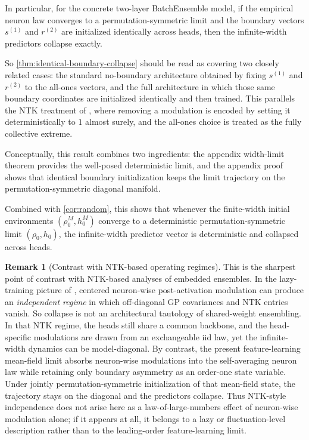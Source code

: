 \documentclass[11pt]{article}
\theoremstyle{definition}
\newtheorem{remark}[theorem]{Remark}
\begin{document}
In particular, for the concrete two-layer BatchEnsemble model, if the empirical
neuron law converges to a permutation-symmetric limit and the boundary vectors
$s^{(1)}$ and $r^{(2)}$ are initialized identically across heads, then the
infinite-width predictors collapse exactly.

So \cref{thm:identical-boundary-collapse} should be read as covering two
closely related cases: the standard no-boundary architecture obtained by fixing
$s^{(1)}$ and $r^{(2)}$ to the all-ones vectors, and the full architecture in
which those same boundary coordinates are initialized identically and then
trained. This parallels the NTK treatment of \cite{velikanov2022}, where
removing a modulation is encoded by setting it deterministically to $1$ almost
surely, and the all-ones choice is treated as the fully collective extreme.

Conceptually, this result combines two ingredients: the appendix width-limit
theorem provides the well-posed deterministic limit, and the appendix proof
shows that identical boundary initialization keeps the limit trajectory on the
permutation-symmetric diagonal manifold.

Combined with \cref{cor:random}, this shows that whenever the finite-width
initial environments $(\rho_0^M,h_0^M)$ converge to a deterministic
permutation-symmetric limit $(\rho_0,h_0)$, the infinite-width predictor vector
is deterministic and collapsed across heads.

\begin{remark}[Contrast with NTK-based operating regimes]
\label{rem:ntk-contrast}
This is the sharpest point of contrast with NTK-based analyses of embedded
ensembles. In the lazy-training picture of \cite{velikanov2022}, centered
neuron-wise post-activation modulation can produce an \emph{independent regime}
in which off-diagonal GP covariances and NTK entries vanish. So collapse is not
an architectural tautology of shared-weight ensembling. In that NTK regime, the
heads still share a common backbone, and the head-specific modulations are
drawn from an exchangeable iid law, yet the infinite-width dynamics can be
model-diagonal. By contrast, the present feature-learning mean-field limit
absorbs neuron-wise modulations into the self-averaging neuron law while
retaining only boundary asymmetry as an order-one state variable. Under jointly
permutation-symmetric initialization of that mean-field state, the trajectory
stays on the diagonal and the predictors collapse. Thus NTK-style independence
does not arise here as a law-of-large-numbers effect of neuron-wise modulation
alone; if it appears at all, it belongs to a lazy or fluctuation-level
description rather than to the leading-order feature-learning limit.
\end{remark}
\end{document}
